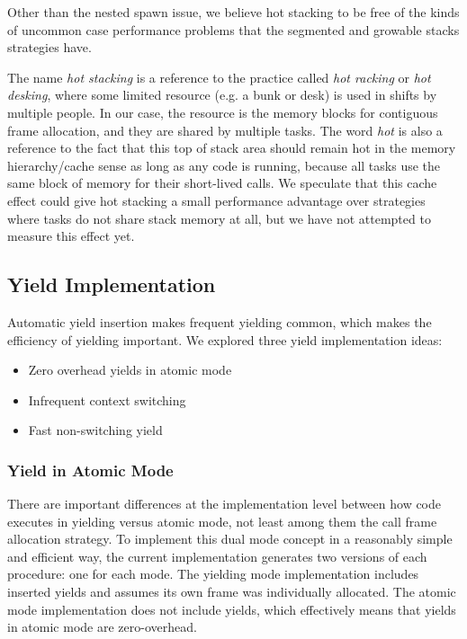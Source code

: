 \documentclass[acmsmall,anonymous,review]{acmart}\settopmatter{printfolios=true,printccs=false,printacmref=false}
\begin{document}
Other than the nested spawn issue, we believe hot stacking to be free of the kinds of uncommon case performance problems that the segmented and growable stacks strategies have.

The name \emph{hot stacking} is a reference to the practice called \emph{hot racking} or \emph{hot desking}, where some limited resource (e.g. a bunk or desk) is used in shifts by multiple people.
In our case, the resource is the memory blocks for contiguous frame allocation, and they are shared by multiple tasks.
The word \emph{hot} is also a reference to the fact that this top of stack area should remain hot in the memory hierarchy/cache sense as long as any code is running, because all tasks use the same block of memory for their short-lived calls.
We speculate that this cache effect could give hot stacking a small performance advantage over strategies where tasks do not share stack memory at all, but we have not attempted to measure this effect yet.


\subsection{Yield Implementation}
\label{sec:yield_imp}

Automatic yield insertion makes frequent yielding common, which makes the efficiency of yielding important.
We explored three yield implementation ideas:

\begin{itemize}
\item Zero overhead yields in atomic mode
\item Infrequent context switching
\item Fast non-switching yield
\end{itemize}

\subsubsection{Yield in Atomic Mode}

There are important differences at the implementation level between how code executes in yielding versus atomic mode, not least among them the call frame allocation strategy.
To implement this dual mode concept in a reasonably simple and efficient way, the current \charcoal{} implementation generates two versions of each procedure: one for each mode.
The yielding mode implementation includes inserted yields and assumes its own frame was individually allocated.
The atomic mode implementation does not include yields, which effectively means that yields in atomic mode are zero-overhead.
\end{document}
